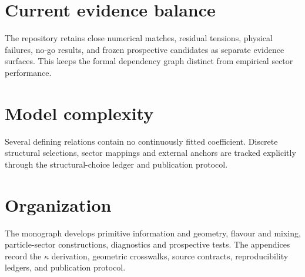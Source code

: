 \section{Current evidence balance}
The repository retains close numerical matches, residual tensions, physical
failures, no-go results, and frozen prospective candidates as separate evidence
surfaces. This keeps the formal dependency graph distinct from empirical sector
performance.

\section{Model complexity}
Several defining relations contain no continuously fitted coefficient. Discrete
structural selections, sector mappings and external anchors are tracked explicitly
through the structural-choice ledger and publication protocol.

\section{Organization}
The monograph develops primitive information and geometry, flavour and mixing,
particle-sector constructions, diagnostics and prospective tests. The appendices
record the $\kappa$ derivation, geometric crosswalks, source contracts,
reproducibility ledgers, and publication protocol.
